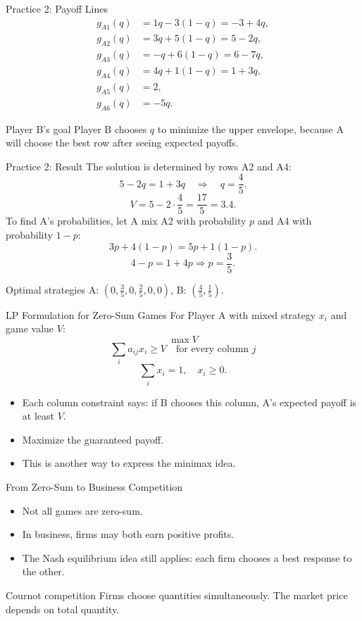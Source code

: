 \documentclass[10pt,aspectratio=169]{beamer}
\begin{document}
\begin{frame}{Practice 2: Payoff Lines}
\[
\begin{aligned}
g_{A1}(q)&=1q-3(1-q)=-3+4q,\\
g_{A2}(q)&=3q+5(1-q)=5-2q,\\
g_{A3}(q)&=-q+6(1-q)=6-7q,\\
g_{A4}(q)&=4q+1(1-q)=1+3q,\\
g_{A5}(q)&=2,\\
g_{A6}(q)&=-5q.
\end{aligned}
\]
\vspace{0.2cm}
\begin{block}{Player B's goal}
Player B chooses $q$ to minimize the upper envelope, because A will choose the best row after seeing expected payoffs.
\end{block}
\end{frame}

\begin{frame}{Practice 2: Result}
The solution is determined by rows A2 and A4:
\[
5-2q = 1+3q \quad \Rightarrow \quad q=\frac{4}{5}.
\]
\[
V=5-2\cdot\frac{4}{5}=\frac{17}{5}=3.4.
\]
To find A's probabilities, let A mix A2 with probability $p$ and A4 with probability $1-p$:
\[
3p+4(1-p)=5p+1(1-p).
\]
\[
4-p=1+4p \Rightarrow p=\frac{3}{5}.
\]
\begin{block}{Optimal strategies}
A: $(0,\frac{3}{5},0,\frac{2}{5},0,0)$, \quad B: $(\frac{4}{5},\frac{1}{5})$.
\end{block}
\end{frame}

\begin{frame}{LP Formulation for Zero-Sum Games}
For Player A with mixed strategy $x_i$ and game value $V$:
\[
\max V
\]
\[
\sum_i a_{ij}x_i \ge V \quad \text{for every column } j
\]
\[
\sum_i x_i=1,\quad x_i\ge 0.
\]
\vspace{0.2cm}
\begin{itemize}
  \item Each column constraint says: if B chooses this column, A's expected payoff is at least $V$.
  \item Maximize the guaranteed payoff.
  \item This is another way to express the minimax idea.
\end{itemize}
\end{frame}

\begin{frame}{From Zero-Sum to Business Competition}
\begin{itemize}
  \item Not all games are zero-sum.
  \item In business, firms may both earn positive profits.
  \item The Nash equilibrium idea still applies: each firm chooses a best response to the other.
\end{itemize}
\vspace{0.2cm}
\begin{block}{Cournot competition}
Firms choose quantities simultaneously. The market price depends on total quantity.
\end{block}
\end{frame}
\end{document}
